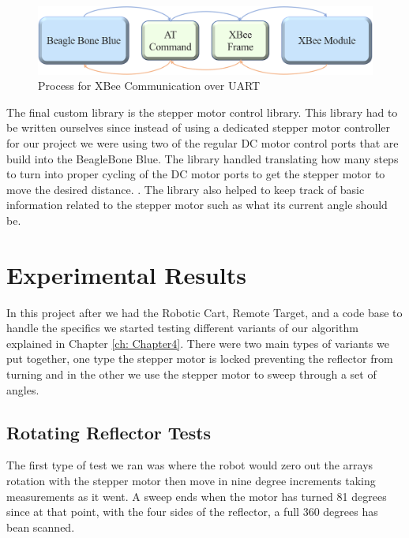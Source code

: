 \begin{figure}[H]
  \centering
  \includegraphics[width=\textwidth]{figs/img/Command Process Diagram.png}
  \caption{Process for XBee Communication over UART}
  \label{fig:CommandProcessDiagram}
\end{figure}

\vspace*{12pt}
\noindent
The final custom library is the stepper motor control library. This library had to be written ourselves since instead of using a dedicated stepper motor controller for our project we were using two of the regular DC motor control ports that are build into the BeagleBone Blue. The library handled translating how many steps to turn into proper cycling of the DC motor ports to get the stepper motor to move the desired distance. . The library also helped to keep track of basic information related to the stepper motor such as what its current angle should be.

\section{Experimental Results}
\label{sec:Experimental Results}

In this project after we had the Robotic Cart, Remote Target, and a code base to handle the specifics we started testing different variants of our algorithm explained in Chapter \ref{ch: Chapter4}. There were two main types of variants we put together, one type the stepper motor is locked preventing the reflector from turning and in the other we use the stepper motor to sweep through a set of angles.

\subsection{Rotating Reflector Tests}

The first type of test we ran was where the robot would zero out the arrays rotation with the stepper motor then move in nine degree increments taking measurements as it went. A sweep ends when the motor has turned 81 degrees since at that point, with the four sides of the reflector, a full 360 degrees has bean scanned.

